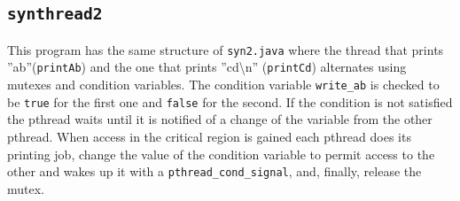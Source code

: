 \subsection{\texttt{synthread2}}
This program has the same structure of \texttt{syn2.java} where the thread that prints ''ab''(\texttt{printAb}) and the one that prints ''cd\textbackslash{}n'' (\texttt{printCd}) alternates using mutexes and condition variables. The condition variable \texttt{write\_ab} is checked to be \texttt{true} for the first one and \texttt{false} for the second. If the condition is not satisfied the pthread waits until it is notified of a change of the variable from the other pthread. When access in the critical region is gained each pthread does its printing job, change the value of the condition variable to permit access to the other and wakes up it with a \texttt{pthread\_cond\_signal}, and, finally, release the mutex.

\clearpage



